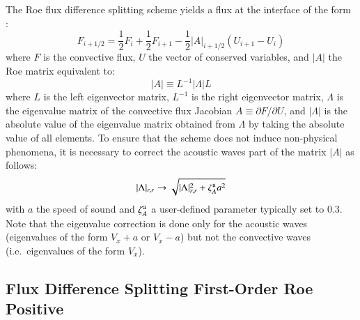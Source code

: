 \documentclass{warpdoc}
\begin{document}
The Roe flux difference splitting scheme yields a flux at the interface of the form \cite{jcp:1981:roe}:
%
\begin{equation}
F_{i+1/2}=\frac{1}{2} F_i + \frac{1}{2} F_{i+1} - \frac{1}{2}|A|_{i+1/2} (U_{i+1}-U_i)
\label{eqn:FDS_1o}
\end{equation}
%
where $F$ is the convective flux,  $U$ the vector of conserved variables, and $|A|$ the Roe matrix equivalent to:
%
\begin{equation}
|A|\equiv L^{-1} |\Lambda| L
\end{equation}
%
where $L$  is the left eigenvector matrix, $L^{-1}$ is the right eigenvector matrix, $\Lambda$ is the eigenvalue matrix of the convective flux Jacobian $A\equiv \partial F / \partial U$, and $|\Lambda|$ is the absolute value of the eigenvalue matrix obtained from $\Lambda$ by taking the absolute value of all elements. To ensure that the scheme does not induce non-physical phenomena, it is necessary to correct the acoustic waves part of the matrix $|A|$ as follows:
%
\begin{equation}
|\Lambda|_{r,r} \rightarrow \sqrt{|\Lambda|_{r,r}^2 + \zeta_A^{\rm a} a^2}
\end{equation}
%
with $a$ the speed of sound and $\zeta_A^{\rm a}$ a user-defined parameter typically set to 0.3. Note that the eigenvalue correction is done only for the acoustic waves (eigenvalues of the form $V_x+a$ or $V_x-a$) but not the convective waves (i.e.\ eigenvalues of the form $V_x$).



\subsection{Flux Difference Splitting First-Order Roe Positive}
\end{document}
